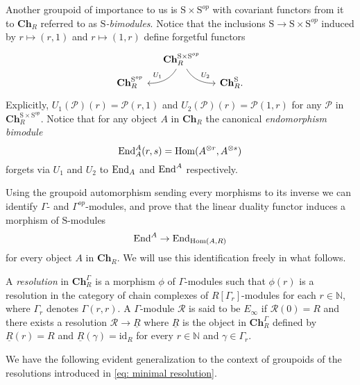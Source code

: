 Another groupoid of importance to us is $\mathrm{S} \times \mathrm{S}^{op}$ with covariant functors from it to $\mathbf{Ch}_R$ referred to as \textit{$\mathrm{S}$-bimodules}.
Notice that the inclusions $\mathrm{S} \to \mathrm{S} \times \mathrm{S}^{op}$ induced by $r \mapsto (r,1)$ and $r \mapsto (1,r)$ define forgetful functors
\begin{equation*}
\begin{tikzcd}[column sep=small, row sep=tiny]
& \mathbf{Ch}_R^{\mathrm{S} \times \mathrm{S}^{op}} \arrow[dl, "U_1"', out=-120, in=0] \arrow[dr, "U_2", out=-60, in=180] & \\
\mathbf{Ch}_R^{\mathrm{S}^{op}} & & \mathbf{Ch}_R^{\mathrm{S}}.
\end{tikzcd}
\end{equation*}
Explicitly, $U_1(\mathcal P)(r) = \mathcal P(r,1)$ and $U_2(\mathcal P)(r) = \mathcal P(1,r)$ for any $\mathcal P$ in $\mathbf{Ch}_R^{\mathrm{S} \times \mathrm{S}^{op}}$.
Notice that for any object $A$ in $\mathbf{Ch}_R$ the canonical \textit{endomorphism bimodule}
\begin{equation*}
\mathrm{End}_A^A(r, s) = \mathrm{Hom}(A^{\otimes r}, A^{\otimes s})
\end{equation*}
forgets via $U_1$ and $U_2$ to $\mathrm{End}_A$ and $\mathrm{End}^A$ respectively.

Using the groupoid automorphism sending every morphisms to its inverse we can identify $\Gamma$- and $\Gamma^{op}$-modules, and prove that the linear duality functor induces a morphism of $\mathrm{S}$-modules
\begin{equation*}
\mathrm{End}^A \to \mathrm{End}_{\mathrm{Hom}(A, R)}
\end{equation*}
for every object $A$ in $\mathbf{Ch}_R$.
We will use this identification freely in what follows.

A \textit{resolution} in $\mathbf{Ch}_R^\Gamma$ is a morphism $\phi$ of $\Gamma$-modules such that $\phi(r)$ is a resolution in the category of chain complexes of $R[\Gamma_r]$-modules for each $r \in \mathbb{N}$, where $\Gamma_r$ denotes $\Gamma(r,r)$.
A $\Gamma$-module $\mathcal R$ is said to be $E_\infty$ if $\mathcal R(0) = R$ and there exists a resolution $\mathcal R \to \underline{R}$ where $\underline{R}$ is the object in $\mathbf{Ch}_R^\Gamma$ defined by $\underline{R}(r) = R$ and $\underline{R}(\gamma) = \mathrm{id}_R$ for every $r \in \mathbb{N}$ and $\gamma \in \Gamma_r$.

We have the following evident generalization to the context of groupoids of the resolutions introduced in \eqref{eq: minimal resolution}.

